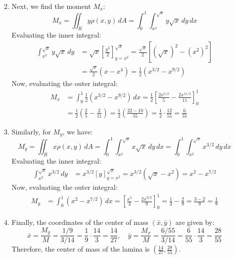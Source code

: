 \documentclass[reqno, 12pt]{amsart}
\begin{document}
\begin{itemize}
\begin{answerbox}
\begin{enumerate}
\begin{align*}
          \end{align*}
        \item Next, we find the moment $M_x$:
          \[M_x = \iint_R y \rho(x,y) \, dA = \int_{0}^{1} \int_{x^2}^{\sqrt{x}} y \sqrt{x} \, dy \, dx\]
          Evaluating the inner integral:
          \begin{align*}
            \int_{x^2}^{\sqrt{x}} y \sqrt{x} \, dy &= \sqrt{x} \left[ \frac{y^2}{2} \right]_{y=x^2}^{\sqrt{x}} = \frac{\sqrt{x}}{2} \left[ (\sqrt{x})^2 - (x^2)^2 \right] \\
            &= \frac{\sqrt{x}}{2} (x - x^4) = \frac{1}{2}(x^{3/2} - x^{9/2})
          \end{align*}
          Now, evaluating the outer integral:
          \begin{align*}
            M_x &= \int_{0}^{1} \frac{1}{2}(x^{3/2} - x^{9/2}) \, dx = \frac{1}{2} \left[ \frac{2x^{5/2}}{5} - \frac{2x^{11/2}}{11} \right]_{0}^{1} \\
            &= \frac{1}{2} \left( \frac{2}{5} - \frac{2}{11} \right) = \frac{1}{2} \left( \frac{22 - 10}{55} \right) = \frac{1}{2} \cdot \frac{12}{55} = \frac{6}{55}
          \end{align*}
        \item Similarly, for $M_y$, we have:
          \[M_y = \iint_R x \rho(x,y) \, dA = \int_{0}^{1} \int_{x^2}^{\sqrt{x}} x \sqrt{x} \, dy \, dx = \int_{0}^{1} \int_{x^2}^{\sqrt{x}} x^{3/2} \, dy \, dx\]
          Evaluating the inner integral:
          \begin{align*}
            \int_{x^2}^{\sqrt{x}} x^{3/2} \, dy &= x^{3/2} [y]_{y=x^2}^{\sqrt{x}} = x^{3/2} (\sqrt{x} - x^2) = x^2 - x^{7/2}
          \end{align*}
          Now, evaluating the outer integral:
          \begin{align*}
            M_y &= \int_{0}^{1} (x^2 - x^{7/2}) \, dx = \left[ \frac{x^3}{3} - \frac{2x^{9/2}}{9} \right]_{0}^{1} = \frac{1}{3} - \frac{2}{9} = \frac{3-2}{9} = \frac{1}{9}
          \end{align*}
        \item Finally, the coordinates of the center of mass $(\bar{x}, \bar{y})$ are given by:
          \[
            \bar{x} = \frac{M_y}{M} = \frac{1/9}{3/14} = \frac{1}{9} \cdot \frac{14}{3} = \frac{14}{27}, \quad \bar{y} = \frac{M_x}{M} = \frac{6/55}{3/14} = \frac{6}{55} \cdot \frac{14}{3} = \frac{28}{55}
          \]
          Therefore, the center of mass of the lamina is $\boxed{\left( \frac{14}{27}, \frac{28}{55} \right)}$.
      \end{enumerate}
    \end{answerbox}
    \vspace{0.5 in}
    

\end{itemize}
\end{document}
